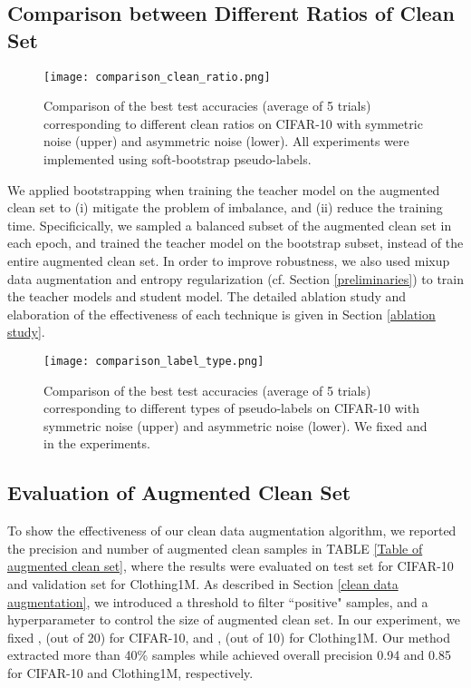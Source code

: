 \documentclass[conference]{IEEEtran}
\begin{document}
\begin{algorithm}[H]
\subsection{Comparison between Different Ratios of Clean Set}
\begin{figure}[tb]
\centering
\texttt{[image: comparison\_clean\_ratio.png]}
\caption{Comparison of the best test accuracies (average of 5 trials) corresponding to different clean ratios  on  CIFAR-10 with symmetric noise (upper) and asymmetric noise (lower). All experiments were implemented using soft-bootstrap pseudo-labels.}
\label{Comparison clean ratio}
\end{figure}







We applied bootstrapping when training the teacher model on the augmented clean set to (i) mitigate the problem of imbalance, and (ii) reduce the training time. Specificically, we sampled a balanced subset of the augmented clean set in each epoch, and trained the teacher model on the bootstrap subset, instead of the entire augmented clean set. In order to improve robustness, we also used mixup data augmentation and entropy regularization (cf. Section \ref{preliminaries}) to train the teacher models and student model. The detailed ablation study and elaboration of the effectiveness of each technique is given in Section \ref{ablation study}.

\begin{figure}[htb!]
\centering
\texttt{[image: comparison\_label\_type.png]}
\caption{Comparison of the best test accuracies (average of 5 trials) corresponding to different types of pseudo-labels on CIFAR-10 with symmetric noise (upper) and asymmetric noise (lower). We fixed  and  in the experiments.}
\label{Comparison types of label}
\end{figure}

\subsection{Evaluation of Augmented Clean Set}
To show the effectiveness of our clean data augmentation algorithm, we reported the precision and number of augmented clean samples in TABLE \ref{Table of augmented clean set}, where the results were evaluated on test set for CIFAR-10 and validation set for Clothing1M. As described in Section \ref{clean data augmentation}, we introduced a threshold  to filter ``positive" samples, and a hyperparameter  to control the size of augmented clean set. In our experiment, we fixed ,  (out of 20) for CIFAR-10, and ,  (out of 10) for Clothing1M. Our method extracted more than 40\% samples while achieved overall precision 0.94 and 0.85 for CIFAR-10 and Clothing1M, respectively. 






\end{algorithm}
\end{document}
